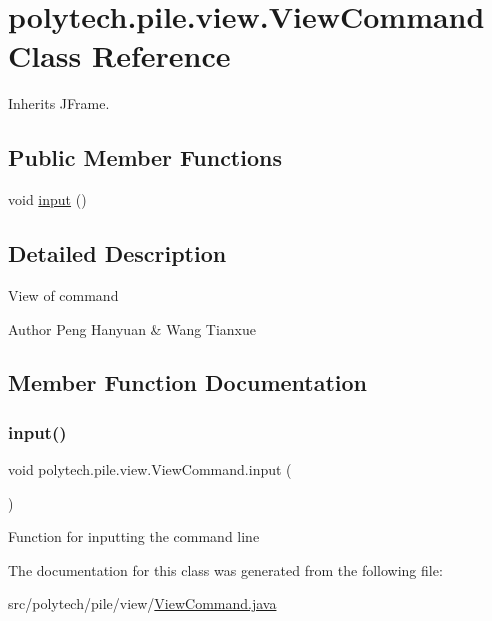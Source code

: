 \hypertarget{classpolytech_1_1pile_1_1view_1_1_view_command}{}\section{polytech.\+pile.\+view.\+View\+Command Class Reference}
\label{classpolytech_1_1pile_1_1view_1_1_view_command}


Inherits J\+Frame.

\subsection*{Public Member Functions}
\begin{DoxyCompactItemize}
\item 
void \hyperlink{classpolytech_1_1pile_1_1view_1_1_view_command_a10b4713c633c558f3aceaa60f9a3f8d8}{input} ()
\end{DoxyCompactItemize}


\subsection{Detailed Description}
View of command

\begin{DoxyAuthor}{Author}
Peng Hanyuan \& Wang Tianxue 
\end{DoxyAuthor}


\subsection{Member Function Documentation}
\hypertarget{classpolytech_1_1pile_1_1view_1_1_view_command_a10b4713c633c558f3aceaa60f9a3f8d8}{}\label{classpolytech_1_1pile_1_1view_1_1_view_command_a10b4713c633c558f3aceaa60f9a3f8d8} 
\subsubsection{\texorpdfstring{input()}{input()}}
{\footnotesize\ttfamily void polytech.\+pile.\+view.\+View\+Command.\+input (\begin{DoxyParamCaption}{ }\end{DoxyParamCaption})}

Function for inputting the command line 

The documentation for this class was generated from the following file\+:\begin{DoxyCompactItemize}
\item 
src/polytech/pile/view/\hyperlink{_view_command_8java}{View\+Command.\+java}\end{DoxyCompactItemize}
